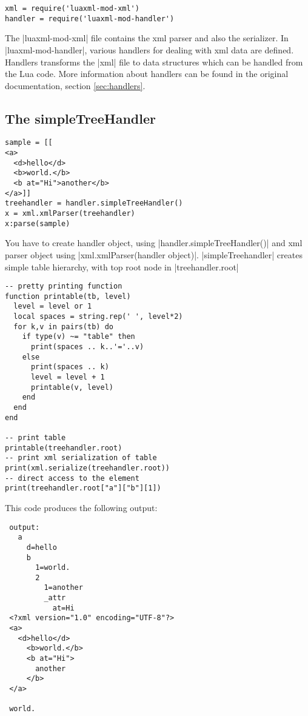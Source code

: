 \documentclass{ltxdoc}
\begin{document}
\begin{verbatim}
xml = require('luaxml-mod-xml')
handler = require('luaxml-mod-handler')
\end{verbatim} 


The |luaxml-mod-xml| file contains the  xml parser and also the serializer. In
|luaxml-mod-handler|, various handlers for dealing with xml data are defined.
Handlers transforms the |xml| file to data structures which can be handled from
the Lua code. More information about handlers can be found in the original
documentation, section \ref{sec:handlers}.

\subsection{The simpleTreeHandler} 
\begin{verbatim}
sample = [[
<a>
  <d>hello</d>
  <b>world.</b>
  <b at="Hi">another</b>
</a>]]
treehandler = handler.simpleTreeHandler()
x = xml.xmlParser(treehandler)
x:parse(sample)
\end{verbatim} 

You have to create handler object, using |handler.simpleTreeHandler()| and xml
parser object using |xml.xmlParser(handler object)|. |simpleTreehandler|
creates simple table hierarchy, with top root node in |treehandler.root|

\begin{verbatim}
-- pretty printing function
function printable(tb, level)
  level = level or 1
  local spaces = string.rep(' ', level*2)
  for k,v in pairs(tb) do
    if type(v) ~= "table" then
      print(spaces .. k..'='..v)
    else
      print(spaces .. k)
      level = level + 1
      printable(v, level)
    end
  end
end

-- print table
printable(treehandler.root)
-- print xml serialization of table
print(xml.serialize(treehandler.root))
-- direct access to the element
print(treehandler.root["a"]["b"][1])
\end{verbatim}

This code produces the following output:

\begin{verbatim}
 output:
   a
     d=hello
     b
       1=world.
       2
         1=another
         _attr
           at=Hi
 <?xml version="1.0" encoding="UTF-8"?>
 <a>
   <d>hello</d>
     <b>world.</b>
     <b at="Hi">
       another
     </b>
 </a>
 
 world.
\end{verbatim}
\end{document}
